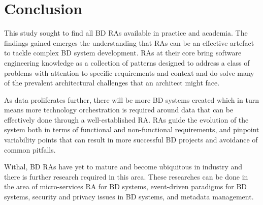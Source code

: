 \documentclass[review]{elsarticle}
\begin{document}
\section{Conclusion}

This study sought to find all BD RAs available in practice and academia. The findings gained emerges the understanding that RAs can be an effective artefact to tackle complex BD system development. RAs at their core bring software engineering knowledge as a collection of patterns designed to address a class of problems with attention to specific requirements and context and do solve many of the prevalent architectural challenges that an architect might face. 

As data proliferates further, there will be more BD systems created which in turn means more technology orchestration is required around data that can be effectively done through a well-established RA. RAs guide the evolution of the system both in terms of functional and non-functional requirements, and pinpoint variability points that can result in more successful BD projects and avoidance of common pitfalls. 

Withal, BD RAs have yet to mature and become ubiquitous in industry and there is further research required in this area. These researches can be done in the area of micro-services RA for BD systems, event-driven paradigms for BD systems, security and privacy issues in BD systems, and metadata management.


\end{document}
